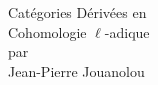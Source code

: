\documentclass[12pt,twoside]{report} %
\theoremstyle{plain}
\theoremstyle{definition}
\begin{document}
\setcounter{tocdepth}{2}
\sloppy


\thispagestyle{empty}
\noindent\makebox[\linewidth]{\rule{4in}{0.01in}}
\vspace*{\fill}
\begin{center}
    {\Huge Catégories Dérivées en} \\
    \vspace{0.5em}
    {\Huge Cohomologie $\ell$-adique} \\
    \vspace{0.5em}
    {\Large par} \\
    \vspace{0.5em}
    {\huge Jean-Pierre Jouanolou}
\end{center}
\vspace*{\fill}
\noindent\makebox[\linewidth]{\rule{4in}{0.01in}}

\newpage
\end{document}
